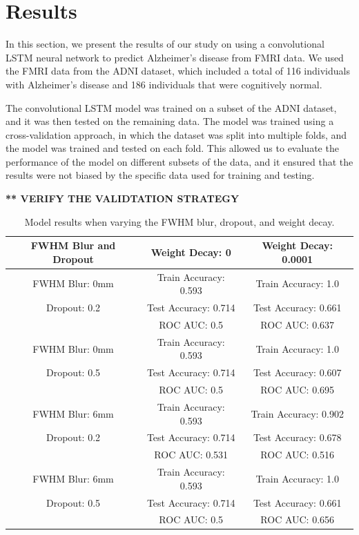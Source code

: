 \documentclass[10pt]{article}
\begin{document}
	\section{Results}

	In this section, we present the results of our study on using a convolutional LSTM neural network to predict Alzheimer's disease from FMRI data. We used the FMRI data from the ADNI dataset, which included a total of 116 individuals with Alzheimer's disease and 186 individuals that were cognitively normal.

	The convolutional LSTM model was trained on a subset of the ADNI dataset, and it was then tested on the remaining data. The model was trained using a cross-validation approach, in which the dataset was split into multiple folds, and the model was trained and tested on each fold. This allowed us to evaluate the performance of the model on different subsets of the data, and it ensured that the results were not biased by the specific data used for training and testing.

	\textbf{** VERIFY THE VALIDTATION STRATEGY}

	\begin{table}[!ht]
		\centering
		\begin{tabular}{|| c | c | c ||} 
			\hline
			FWHM Blur and Dropout & Weight Decay: 0 & Weight Decay: 0.0001 \\ [0.5ex] 
			\hline\hline
			FWHM Blur: 0mm & Train Accuracy: 0.593 & Train Accuracy: 1.0 \\
			Dropout: 0.2 & Test Accuracy: 0.714 & Test Accuracy: 0.661 \\
			 & ROC AUC: 0.5 & ROC AUC: 0.637 \\
			\hline
			FWHM Blur: 0mm & Train Accuracy: 0.593 & Train Accuracy: 1.0 \\
			Dropout: 0.5 & Test Accuracy: 0.714 & Test Accuracy: 0.607 \\
			 & ROC AUC: 0.5 & ROC AUC: 0.695 \\
			\hline
			FWHM Blur: 6mm & Train Accuracy: 0.593 & Train Accuracy: 0.902 \\
			Dropout: 0.2 & Test Accuracy: 0.714 & Test Accuracy: 0.678 \\
			 & ROC AUC: 0.531 & ROC AUC: 0.516 \\
			\hline
			FWHM Blur: 6mm & Train Accuracy: 0.593 & Train Accuracy: 1.0 \\
			Dropout: 0.5 & Test Accuracy: 0.714 & Test Accuracy: 0.661 \\
			 & ROC AUC: 0.5 & ROC AUC: 0.656 \\
			\hline
		\end{tabular}
		\caption{Model results when varying the FWHM blur, dropout, and weight decay.}
		\label{tab:performance}
	\end{table}
\end{document}
